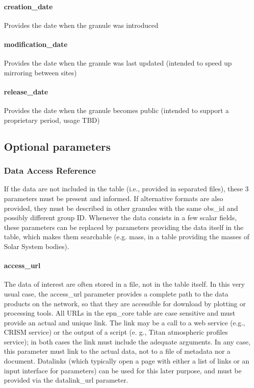 \documentclass[11pt,a4paper]{ivoa}
\begin{document}
\paragraph{creation\_date}

Provides the date when the granule was introduced

\paragraph{modification\_date}

Provides the date when the granule was last updated (intended to speed up mirroring between sites)

\paragraph{release\_date}

Provides the date when the granule becomes public (intended to support a proprietary period, usage TBD)

\subsection{Optional parameters}

\subsubsection{Data Access Reference}

If the data are not included in the table (i.e., provided in separated files), these 3 parameters must be present and informed. If alternative formats are also provided, they must be described in other granules with the same obs\_id and possibly different group ID. Whenever the data consists in a few scalar fields, these parameters can be replaced by parameters providing the data itself in the table, which makes them searchable (e.g. mass, in a table providing the masses of Solar System bodies).

\paragraph{access\_url}

The data of interest are often stored in a file, not in the table itself. In this very usual case, the access\_url parameter provides a complete path to the data products on the network, so that they are accessible for download by plotting or processing tools. All URLs in the epn\_core table are case sensitive and must provide an actual and unique link. The link may be a call to a web service (e.g., CRISM service) or the output of a script (e. g., Titan atmospheric profiles service); in both cases the link must include the adequate arguments. In any case, this parameter must link to the actual data, not to a file of metadata nor a document. Datalinks (which typically open a page with either a list of links or an input interface for parameters) can be used for this later purpose, and must be provided via the datalink\_url parameter. 
\end{document}
